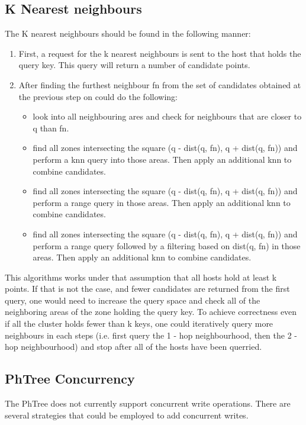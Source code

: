 \documentclass[11pt,a4paper]{globis-book}
\begin{document}
\subsection{K Nearest neighbours}
The K nearest neighbours should be found in the following manner:
\begin{enumerate}
    \item First, a request for the k nearest neighbours is sent to the host that holds the query key. This query will return a number of candidate points.
    \item After finding the furthest neighbour fn from the set of candidates obtained at the previous step on could do the following:
        \begin{itemize}
            \item look into all neighbouring ares and check for neighbours that are closer to q than fn.
            \item find all zones intersecting the square (q - dist(q, fn), q + dist(q, fn)) and perform a knn query into those areas. Then apply an additional knn to combine candidates.
            \item find all zones intersecting the square (q - dist(q, fn), q + dist(q, fn)) and perform a range query in those areas. Then apply an additional knn to combine candidates.
            \item find all zones intersecting the square (q - dist(q, fn), q + dist(q, fn)) and perform a range query followed by a filtering based on dist(q, fn) in those areas. Then apply an additional knn to combine candidates.
        \end{itemize}
\end{enumerate}

This algorithms works under that assumption that all hosts hold at least k points. If that is not the case, and fewer candidates are returned from the first query, one would need to increase the query space and check all of the neighboring areas of the zone holding the query key. To achieve correctness even if all the cluster holds fewer than k keys, one could iteratively query more neighbours in each steps (i.e. first query the 1 - hop neighbourhood, then the 2 - hop neighbourhood) and stop after all of the hosts have been querried.

\subsection{PhTree Concurrency}
The PhTree does not currently support concurrent write operations. There are several strategies that could be employed to add concurrent writes.
\end{document}
